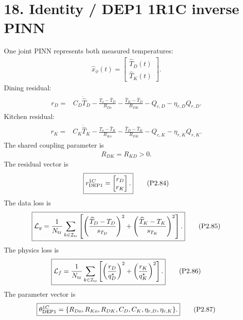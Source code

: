 \documentclass[11pt]{article}
\begin{document}
\section*{18. Identity / DEP1 1R1C inverse PINN}
One joint PINN represents both measured temperatures:
\begin{align}
\boxed{\widehat x_\phi(t)=\begin{bmatrix}\widehat T_D(t)\\\widehat T_K(t)\end{bmatrix}.}
\tag{P2.80}
\end{align}
Dining residual:
\begin{align}
\boxed{\begin{aligned}
r_D={}&C_D\dot{\widehat T}_D-\frac{T_o-\widehat T_D}{R_{Do}}-\frac{\widehat T_K-\widehat T_D}{R_{DK}}-Q_{c,D}-\eta_{r,D}Q_{r,D}.
\end{aligned}}
\tag{P2.81}
\end{align}
Kitchen residual:
\begin{align}
\boxed{\begin{aligned}
r_K={}&C_K\dot{\widehat T}_K-\frac{T_o-\widehat T_K}{R_{Ko}}-\frac{\widehat T_D-\widehat T_K}{R_{DK}}-Q_{c,K}-\eta_{r,K}Q_{r,K}.
\end{aligned}}
\tag{P2.82}
\end{align}
The shared coupling parameter is
\begin{align}
\boxed{R_{DK}=R_{KD}>0.}
\tag{P2.83}
\end{align}
The residual vector is
\begin{align}
\boxed{r_{\rm DEP1}^{1C}=\begin{bmatrix}r_D\\r_K\end{bmatrix}.}
\tag{P2.84}
\end{align}
The data loss is
\begin{align}
\boxed{\mathcal L_y=\frac{1}{N_{\rm tr}}\sum_{k\in\mathcal I_{\rm tr}}\left[\left(\frac{\widehat T_D-T_D}{s_{T_D}}\right)^2+\left(\frac{\widehat T_K-T_K}{s_{T_K}}\right)^2\right].}
\tag{P2.85}
\end{align}
The physics loss is
\begin{align}
\boxed{\mathcal L_f=\frac{1}{N_{\rm tr}}\sum_{k\in\mathcal I_{\rm tr}}\left[\left(\frac{r_D}{q_D^\star}\right)^2+\left(\frac{r_K}{q_K^\star}\right)^2\right].}
\tag{P2.86}
\end{align}
The parameter vector is
\begin{align}
\boxed{\theta_{\rm DEP1}^{1C}=\{R_{Do},R_{Ko},R_{DK},C_D,C_K,\eta_{r,D},\eta_{r,K}\}.}
\tag{P2.87}
\end{align}
\end{document}
